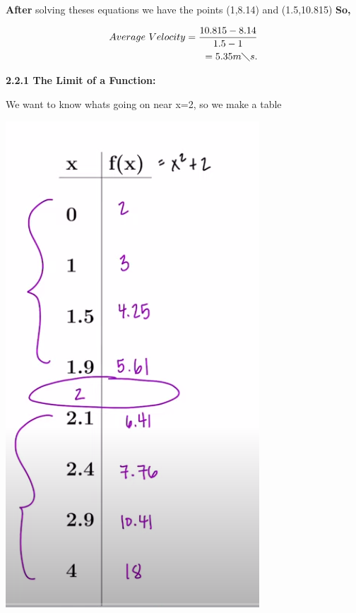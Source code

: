 \documentclass{report}
\begin{document}
    \bigbreak \noindent 
    \textbf{After} solving theses equations we have the points (1,8.14) and (1.5,10.815)
    \bigbreak \noindent 
    \textbf{So,}
    
    \begin{align*}
        Average\ Velocity = \frac{10.815-8.14}{1.5-1} \\
        = 5.35 m \diagdown s
    .\end{align*}


    \pagebreak
    \begin{Large}
        \textbf{2.2.1 The Limit of a Function:}
    \end{Large}
    
   \bigbreak \noindent \bigbreak \noindent  

    \bigbreak \noindent 
    We want to know whats going on near x=2, so we make a table

    \bigbreak \noindent 
    \begin{center}
        \includegraphics[scale=0.5]{../images/tbale.png}
    \end{center}
\end{document}
